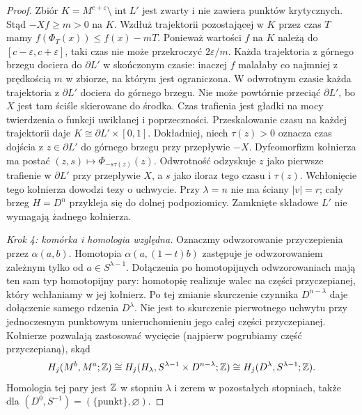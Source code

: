 \begin{proof}
Zbiór $K=M^{c+\varepsilon}\setminus\operatorname{int}L'$
jest zwarty i nie zawiera punktów krytycznych.
Stąd $-Xf\geq m>0$ na $K$.
Wzdłuż trajektorii pozostającej w $K$ przez czas $T$
mamy $f(\Phi_T(x))\leq f(x)-mT$.
Ponieważ wartości $f$ na $K$ należą do $[c-\varepsilon,c+\varepsilon]$,
taki czas nie może przekroczyć $2\varepsilon/m$.
Każda trajektoria z górnego brzegu dociera do $\partial L'$
w skończonym czasie: inaczej $f$ malałaby co najmniej
z prędkością $m$ w zbiorze, na którym jest ograniczona.
W odwrotnym czasie każda trajektoria z $\partial L'$
dociera do górnego brzegu. Nie może powtórnie przeciąć
$\partial L'$, bo $X$ jest tam ściśle skierowane do środka.
Czas trafienia jest gładki na mocy twierdzenia
o funkcji uwikłanej i poprzeczności.
Przeskalowanie czasu na każdej trajektorii daje
$K\cong\partial L'\times[0,1]$.
Dokładniej, niech $\tau(z)>0$ oznacza czas dojścia
z $z\in\partial L'$ do górnego brzegu przy przepływie $-X$.
Dyfeomorfizm kołnierza ma postać
$(z,s)\mapsto\Phi_{-s\tau(z)}(z)$.
Odwrotność odzyskuje $z$ jako pierwsze trafienie w $\partial L'$
przy przepływie $X$, a $s$ jako iloraz tego czasu i $\tau(z)$.
Wchłonięcie tego kołnierza dowodzi tezy o uchwycie.
Przy $\lambda=n$ nie ma ściany $|v|=r$;
cały brzeg $H=D^n$ przykleja się do dolnej podpoziomicy.
Zamknięte składowe $L'$ nie wymagają żadnego kołnierza.

\emph{Krok 4: komórka i homologia względna.}
Oznaczmy odwzorowanie przyczepienia przez $\alpha(a,b)$.
Homotopia $\alpha(a,(1-t)b)$ zastępuje je odwzorowaniem
zależnym tylko od $a\in S^{\lambda-1}$.
Dołączenia po homotopijnych odwzorowaniach mają ten sam typ
homotopijny pary: homotopię realizuje walec na części
przyczepianej, który wchłaniamy w jej kołnierz.
Po tej zmianie skurczenie czynnika $D^{n-\lambda}$
daje dołączenie samego rdzenia $D^\lambda$.
Nie jest to skurczenie pierwotnego uchwytu
przy jednoczesnym punktowym unieruchomieniu jego całej
części przyczepianej.
Kołnierze pozwalają zastosować wycięcie
(najpierw pogrubiamy część przyczepianą), skąd
\[
 H_j(M^b,M^a;\mathbb{Z})
 \cong H_j(H_\lambda,S^{\lambda-1}\times D^{n-\lambda};\mathbb{Z})
 \cong H_j(D^\lambda,S^{\lambda-1};\mathbb{Z}).
\]
Homologia tej pary jest $\mathbb{Z}$ w stopniu $\lambda$
i zerem w pozostałych stopniach, także dla
$(D^0,S^{-1})=(\{\mathrm{punkt}\},\varnothing)$.
\end{proof}

